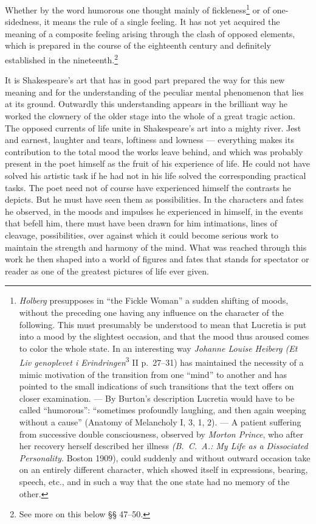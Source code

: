 \documentclass[12pt]{book}
\newcommand{\opage}[1]{\marginnote{\footnotesize\textit{[#1]}}}
\begin{document}
Whether by the word humorous one thought mainly of fickleness\footnote{%
\textit{Holberg} presupposes in ``the Fickle Woman'' a sudden shifting of moods,
without the preceding one having any influence on the character of the following.
This must presumably be understood to mean that Lucretia is put into a mood by the
slightest occasion, and that the mood thus aroused comes to color the whole state.
In an interesting way \textit{Johanne Louise Heiberg (Et Liv genoplevet i
Erindringen}\textsuperscript{3} II p.~27--31) has maintained the necessity of a
mimic motivation of the transition from one ``mind'' to another and has pointed to
the small indications of such transitions that the text offers on closer
examination. --- By Burton's description Lucretia would have to be called
``humorous'': ``sometimes profoundly laughing, and then again weeping without a
cause'' (Anatomy of Melancholy I, 3, 1, 2). --- A patient suffering from
successive double consciousness, observed by \textit{Morton Prince}, who after her
recovery herself described her illness \textit{(B.~C.~A.: My Life as a
Dissociated Personality.} Boston 1909), could suddenly and without outward
occasion take on an entirely different character, which showed itself in
expressions, bearing, speech, etc., and in such a way that the one state had no
memory of the other.} or of one-sidedness, it means the rule of a single feeling.
It has not yet acquired the meaning of a composite feeling arising through the
clash of opposed elements, which is prepared in the course of the eighteenth
century and definitely established in the nineteenth.\footnote{See more on this
below §§ 47--50.}

It is Shakespeare's art that has in good part prepared the way for this new
meaning and for the understanding of the peculiar mental phenomenon that lies at
its ground. Outwardly this understanding appears in the brilliant way he worked
the clownery of the older stage into the whole of a great tragic action. The
opposed currents of life unite in Shakespeare's art into a mighty river. Jest and
earnest, laughter and \opage{43}tears, loftiness and lowness --- everything makes
its contribution to the total mood the works leave behind, and which was probably
present in the poet himself as the fruit of his experience of life. He could not
have solved his artistic task if he had not in his life solved the corresponding
practical tasks. The poet need not of course have experienced himself the
contrasts he depicts. But he must have seen them as possibilities. In the
characters and fates he observed, in the moods and impulses he experienced in
himself, in the events that befell him, there must have been drawn for him
intimations, lines of cleavage, possibilities, over against which it could become
serious work to maintain the strength and harmony of the mind. What was reached
through this work he then shaped into a world of figures and fates that stands for
spectator or reader as one of the greatest pictures of life ever given.
\end{document}
